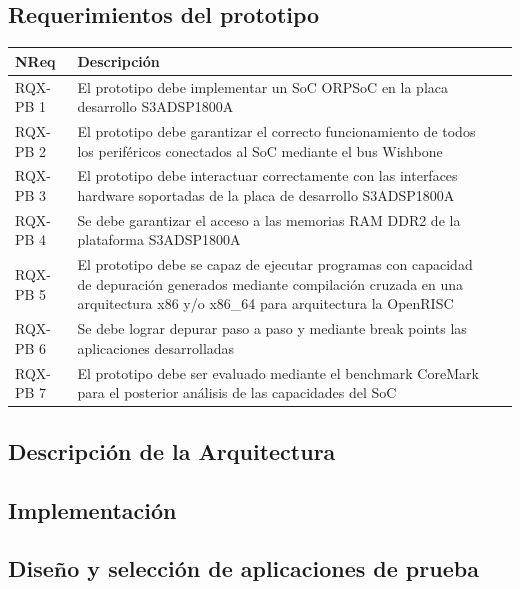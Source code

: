		\subsection{Requerimientos del prototipo}
		\begin{table}[h]
		\centering
		\begin{tabular}{ p{2.5cm} p{8cm} p{3cm} }
		\hline 
		\rowcolor[gray]{0.8} N\textordmasculine Req & Descripción\\
		\hline 
		RQX-PB 1 & El prototipo debe implementar un SoC ORPSoC en la placa desarrollo S3ADSP1800A\\ 
		\hline 
		RQX-PB 2 & El prototipo debe garantizar el correcto funcionamiento de todos los periféricos conectados al SoC mediante el bus Wishbone\\ 
		\hline 
		RQX-PB 3 & El prototipo debe interactuar correctamente con las interfaces hardware soportadas de la placa de desarrollo S3ADSP1800A\\ 
		\hline
		RQX-PB 4 & Se debe garantizar el acceso a las memorias RAM DDR2 de la plataforma S3ADSP1800A\\
		\hline
		RQX-PB 5 & El prototipo debe se capaz de ejecutar programas con capacidad de depuración generados mediante compilación
		cruzada en una arquitectura x86 y/o x86\_64 para arquitectura la OpenRISC\\
		\hline
		RQX-PB 6 & Se debe lograr depurar paso a paso y mediante break points las aplicaciones desarrolladas\\
		\hline
		RQX-PB 7 & El prototipo debe ser evaluado mediante el benchmark CoreMark para el posterior análisis de las capacidades del SoC\\
		\hline		
		\end{tabular}
		\end{table}

		\subsection{Descripción de la Arquitectura}

	
		\subsection{Implementación}

		
		\subsection{Diseño y selección de aplicaciones de prueba}
		
